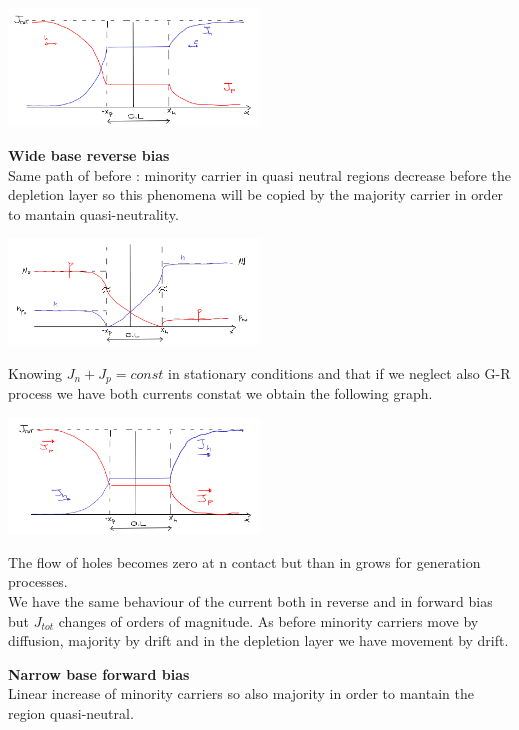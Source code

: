 \centering
\includegraphics[width=0.5\textwidth]{wbfbJ.png}\\
\raggedright

{\bf Wide base reverse bias}\\
Same path of before : minority carrier in quasi neutral regions decrease before the depletion layer so this phenomena will be copied by the majority carrier in order to mantain quasi-neutrality.

\centering
\includegraphics[width=0.5\textwidth]{rbwb.png}\\
\raggedright

Knowing $J_n+J_p=const$ in stationary conditions and that if we neglect also G-R process we have both currents constat we obtain the following graph.

\centering
\includegraphics[width=0.5\textwidth]{wbrb.png}\\
\raggedright

The flow of holes becomes zero at n contact but than in grows for generation processes.\\
We have the same behaviour of the current both in reverse and in forward bias but $J_{tot}$ changes of orders of magnitude. As before minority carriers move by diffusion, majority by drift and in the depletion layer we have movement by drift.\\
\vspace{5mm}


{\bf Narrow base forward bias}\\
Linear increase of minority carriers so also majority in order to mantain the region quasi-neutral.\\


